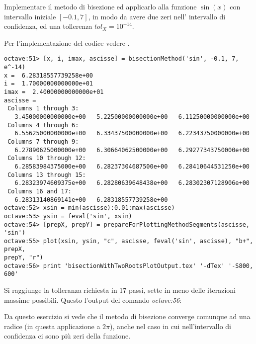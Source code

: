 \begin{exercise}
Implementare il metodo di bisezione ed applicarlo alla funzione $\sin(x)$ 
con intervallo iniziale $[-0.1, 7]$, in modo da avere due zeri nell'
intervallo di confidenza, ed una tollerenza $tol_{X} = 10^{-14}$.
\end{exercise}
Per l'implementazione del codice vedere .
\begin{lstlisting}
octave:51> [x, i, imax, ascisse] = bisectionMethod('sin', -0.1, 7, e^-14)
x =  6.28318557739258e+00
i =  1.70000000000000e+01
imax =  2.40000000000000e+01
ascisse =
 Columns 1 through 3:
   3.45000000000000e+00   5.22500000000000e+00   6.11250000000000e+00
 Columns 4 through 6:
   6.55625000000000e+00   6.33437500000000e+00   6.22343750000000e+00
 Columns 7 through 9:
   6.27890625000000e+00   6.30664062500000e+00   6.29277343750000e+00
 Columns 10 through 12:
   6.28583984375000e+00   6.28237304687500e+00   6.28410644531250e+00
 Columns 13 through 15:
   6.28323974609375e+00   6.28280639648438e+00   6.28302307128906e+00
 Columns 16 and 17:
   6.28313140869141e+00   6.28318557739258e+00
octave:52> xsin = min(ascisse):0.01:max(ascisse)
octave:53> ysin = feval('sin', xsin)
octave:54> [prepX, prepY] = prepareForPlottingMethodSegments(ascisse, 'sin')
octave:55> plot(xsin, ysin, "c", ascisse, feval('sin', ascisse), "b+", prepX,
prepY, "r") 
octave:56> print 'bisectionWithTwoRootsPlotOutput.tex' '-dTex' '-S800, 600'
\end{lstlisting}
Si raggiunge la tolleranza richiesta in 17 passi, sette in meno delle iterazioni massime possibili. 
Questo l'output del comando \emph{octave:56}:
\begin{center}

\end{center}

Da questo esercizio si vede che il metodo di bisezione converge comunque
ad una radice (in questa applicazione a $2\pi$), anche nel caso in cui
nell'intervallo di confidenza ci sono pi\`u zeri della funzione.




